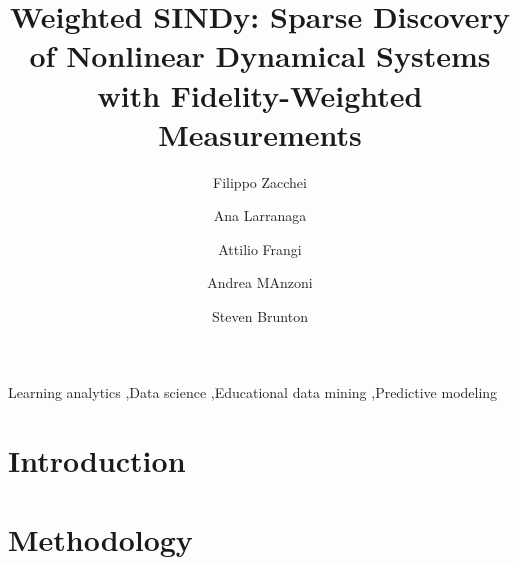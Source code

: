 \documentclass[final,3p,10.5pt]{elsarticle}
\begin{document}
\begin{frontmatter}

\title{Weighted SINDy: Sparse Discovery of Nonlinear Dynamical Systems with Fidelity-Weighted Measurements}

\author[aff1]{Filippo Zacchei}

\author[aff2]{Ana Larranaga}

\author[aff3]{Attilio Frangi}

\author[aff1]{Andrea MAnzoni}

\author[aff4]{Steven Brunton}

\address[aff1]{Politecnico di Milano, MOX - Dept. of Mathematics, p.za Leonardo da Vinci, 32, Milano, 20133, Italy}
\address[aff2]{AI Institute in Dynamic Systems, University of Washington, Seattle, USA}
\address[aff3]{Politecnico di Milano, Dept. of Civil and Environmental Engineering, p.za Leonardo da Vinci, 32, Milano, 20133, Italy}
\address[aff4]{Department of Mechanical Engineering, University of Washington, Seattle, Washington 98195, USA}



\begin{keyword}
Learning analytics \sep Data science \sep Educational data mining \sep Predictive modeling
\end{keyword}

\end{frontmatter}

\section{Introduction}

\section{Methodology}


\end{document}
